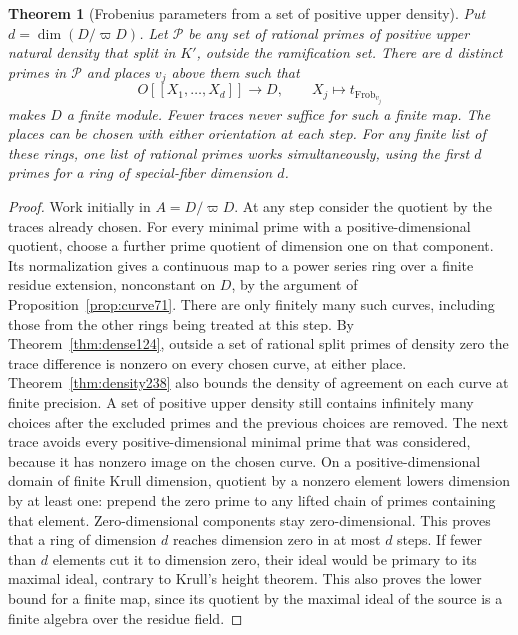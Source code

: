 \documentclass[a4paper,11pt]{article}
\newtheorem{theorem}[proposition]{Theorem}
\theoremstyle{definition}
\theoremstyle{remark}
\newcommand{\Frob}{\operatorname{Frob}}\newcommand{\Gal}{\operatorname{Gal}}
\numberwithin{equation}{section}
\begin{document}
\begin{theorem}[Frobenius parameters from a set of positive upper density]
\leavevmode\label{thm:params238}
Put \(d=\dim(D/\varpi D)\). Let \(\mathcal P\) be any set of rational
primes of positive upper natural density that split in \(K'\), outside
the ramification set. There are \(d\) distinct primes in \(\mathcal P\)
and places \(v_j\) above them such that
\[
 O[[X_1,\ldots,X_d]]\longrightarrow D,\qquad
                X_j\longmapsto t_{\Frob_{v_j}}
\]
makes \(D\) a finite module. Fewer traces never suffice for such a
finite map. The places can be chosen with either orientation at each
step. For any finite list of these rings, one list of rational primes
works simultaneously, using the first \(d\) primes for a ring of
special-fiber dimension \(d\).
\end{theorem}
\begin{proof}
Work initially in \(A=D/\varpi D\). At any step consider the quotient
by the traces already chosen. For every minimal prime with a
positive-dimensional quotient, choose a further prime quotient of
dimension one on that component. Its normalization gives a continuous
map to a power series ring over a finite residue extension, nonconstant
on \(D\), by the argument of Proposition~\ref{prop:curve71}.
There are only finitely many such curves, including those from the
other rings being treated at this step. By Theorem~\ref{thm:dense124},
outside a set of rational split primes of density zero the trace
difference is nonzero on every chosen curve, at either place. Theorem~\ref{thm:density238}
also bounds the density of agreement on each curve at finite precision.
A set of positive upper density still contains infinitely many choices
after the excluded primes and the previous choices are removed.
The next trace avoids every positive-dimensional minimal prime that
was considered, because it has nonzero image on the chosen curve.
On a positive-dimensional domain of finite Krull dimension, quotient
by a nonzero element lowers dimension by at least one: prepend the
zero prime to any lifted chain of primes containing that element.
Zero-dimensional components stay zero-dimensional. This proves that
a ring of dimension \(d\) reaches dimension zero in at most \(d\)
steps. If fewer than \(d\) elements cut it to dimension zero, their
ideal would be primary to its maximal ideal, contrary to Krull's
height theorem. This also proves the lower bound for a finite map,
since its quotient by the maximal ideal of the source is a finite
algebra over the residue field.


\end{proof}
\end{document}
